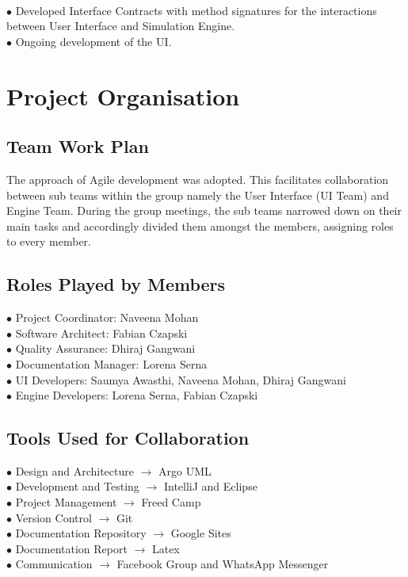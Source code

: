 \documentclass[11pt]{article}
\begin{document}
		\\
		 $\bullet$ Developed Interface Contracts with method signatures for the interactions between User Interface and Simulation Engine.\\
		 $\bullet$ Ongoing development of the UI.


\section{Project Organisation}\label{Section-PO}

		\subsection{Team Work Plan}\label{SubSec-TWP} The approach of Agile development was adopted. This facilitates collaboration between sub teams within the group namely the User Interface (UI Team) and Engine Team. During the group meetings, the sub teams narrowed down on their main tasks and accordingly divided them amongst the members, assigning roles to every member.

		\subsection{Roles Played by Members}\label{SubSec-RPM} 
		 $\bullet$ Project Coordinator: Naveena Mohan\\
		 $\bullet$ Software Architect: Fabian Czapski\\
		 $\bullet$ Quality Assurance: Dhiraj Gangwani\\
		 $\bullet$ Documentation Manager: Lorena Serna\\
		 $\bullet$ UI Developers: Saumya Awasthi, Naveena Mohan, Dhiraj Gangwani\\
		 $\bullet$ Engine Developers: Lorena Serna, Fabian Czapski
			

		\subsection{Tools Used for Collaboration}\label{SubSec-TUC}
		 $\bullet$ Design and Architecture $\rightarrow$ Argo UML\\
		 $\bullet$ Development and Testing $\rightarrow$ IntelliJ and Eclipse\\
		 $\bullet$ Project Management $\rightarrow$ Freed Camp\\
		 $\bullet$ Version Control $\rightarrow$ Git\\
		 $\bullet$ Documentation Repository $\rightarrow$ Google Sites\\
		 $\bullet$ Documentation Report $\rightarrow$ Latex\\
		 $\bullet$ Communication $\rightarrow$ Facebook Group  and WhatsApp Messenger
\end{document}
